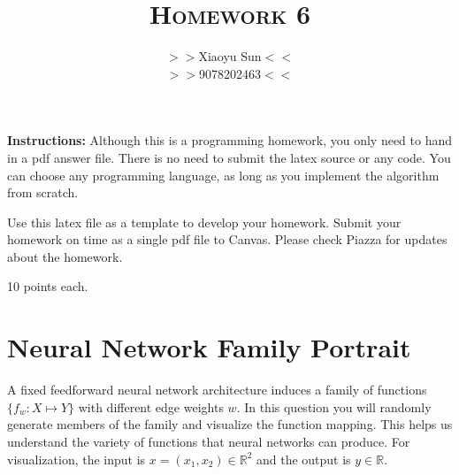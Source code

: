 \documentclass[a4paper]{article}
\title{\textsc{Homework 6}} %
\author{
$>>$Xiaoyu Sun$<<$ \\
$>>$9078202463$<<$\\
}
\date{}
\theoremstyle{definition}
\def\R{\mathbb R}
\begin{document}
\maketitle 


\textbf{Instructions:} 
Although this is a programming homework, you only need to hand in a pdf answer file.
There is no need to submit the latex source or any code.
You can choose any programming language, as long as you implement the algorithm from scratch. 

Use this latex file as a template to develop your homework.
Submit your homework on time as a single pdf file to Canvas.
Please check Piazza for updates about the homework.

10 points each.

\section{Neural Network Family Portrait}
A fixed feedforward neural network architecture induces a family of functions $\{f_w: X \mapsto Y\}$ with different edge weights $w$.
In this question you will randomly generate members of the family and visualize the function mapping. 
This helps us understand the variety of functions that neural networks can produce. 
For visualization, the input is $x=(x_1, x_2) \in \R^2$ and the output is $y\in\R$.
\end{document}
